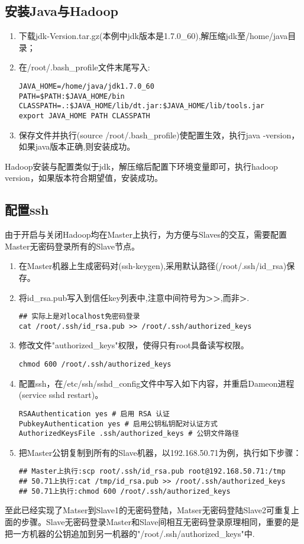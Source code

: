 \subsection{安装Java与Hadoop}
\begin{enumerate}[(1)]
\item 下载jdk-Version.tar.gz(本例中jdk版本是1.7.0\_60),解压缩jdk至/home/java目录；
\item 在/root/.bash\_profile文件末尾写入:
\begin{verbatim}
JAVA_HOME=/home/java/jdk1.7.0_60
PATH=$PATH:$JAVA_HOME/bin
CLASSPATH=.:$JAVA_HOME/lib/dt.jar:$JAVA_HOME/lib/tools.jar
export JAVA_HOME PATH CLASSPATH
\end{verbatim}
\item 保存文件并执行(source /root/.bash\_profile)使配置生效，执行java -version，如果java版本正确,则安装成功。
\end{enumerate}
\par Hadoop安装与配置类似于jdk，解压缩后配置下环境变量即可，执行hadoop version，如果版本符合期望值，安装成功。
\subsection{配置ssh}
\par 由于开启与关闭Hadoop均在Master上执行，为方便与Slaves的交互，需要配置Master无密码登录所有的Slave节点。
\begin{enumerate}[(1)]
\item 在Master机器上生成密码对(ssh-keygen),采用默认路径(/root/.ssh/id\_rsa)保存。
\item 将id\_rsa.pub写入到信任key列表中,注意中间符号为\textbf{>>},而非\textbf{>}.
\begin{verbatim}
## 实际上是对localhost免密码登录
cat /root/.ssh/id_rsa.pub >> /root/.ssh/authorized_keys
\end{verbatim}
\item 修改文件"authorized\_keys"权限，使得只有root具备读写权限。
\begin{verbatim}
chmod 600 /root/.ssh/authorized_keys
\end{verbatim}
\item 配置ssh，在/etc/ssh/sshd\_config文件中写入如下内容，并重启Dameon进程(service sshd restart)。
\begin{verbatim}
RSAAuthentication yes # 启用 RSA 认证
PubkeyAuthentication yes # 启用公钥私钥配对认证方式
AuthorizedKeysFile .ssh/authorized_keys # 公钥文件路径
\end{verbatim}
\item 把Master公钥复制到所有的Slave机器，以192.168.50.71为例，执行如下步骤：
\begin{verbatim}
## Master上执行:scp root/.ssh/id_rsa.pub root@192.168.50.71:/tmp
## 50.71上执行:cat /tmp/id_rsa.pub >> /root/.ssh/authorized_keys
## 50.71上执行:chmod 600 /root/.ssh/authorized_keys
\end{verbatim}
\end{enumerate}
\par 至此已经实现了Matser到Slave1的无密码登陆，Matser无密码登陆Slave2可重复上面的步骤。Slave无密码登录Master和Slave间相互无密码登录原理相同，重要的是把一方机器的公钥追加到另一机器的"/root/.ssh/authorized\_keys"中.
